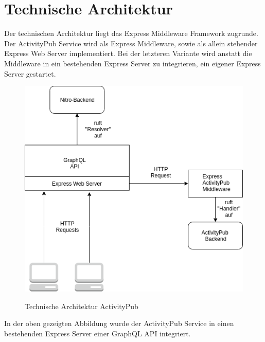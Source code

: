 \section{Technische Architektur}
	Der technischen Architektur liegt das Express Middleware Framework zugrunde. Der ActivityPub Service wird als Express Middleware, sowie als allein stehender Express Web Server implementiert. Bei der letzteren Variante wird anstatt die Middleware in ein bestehenden Express Server zu integrieren, ein eigener Express Server gestartet.\\
	\begin{figure}[h]
		\centering
		\includegraphics[scale=0.6]{figures/technische-architektur-activitypub.png}
		\label{technische-architektur-activitypub}
		\caption{Technische Architektur ActivityPub}
	\end{figure}
	In der oben gezeigten Abbildung wurde der ActivityPub Service in einen bestehenden Express Server einer GraphQL API integriert.\\
	
